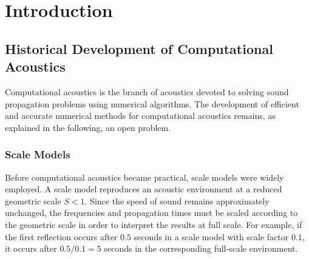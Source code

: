 \documentclass{Configuration_Files/PoliMi3i_thesis}
\begin{document}

\thispagestyle{empty}
\tableofcontents %
\thispagestyle{empty}
\cleardoublepage

%
%
%    
%

\mainmatter %

\chapter{Introduction}
\label{ch:introduction}
\setcounter{secnumdepth}{1}
\section{Historical Development of Computational Acoustics}
Computational acoustics is the branch of acoustics devoted to solving sound propagation problems using numerical algorithms. The development of efficient and accurate numerical methods for computational acoustics remains, as explained in the following, an open problem.

\subsection{Scale Models}
Before computational acoustics became practical, scale models were widely employed. A scale model reproduces an acoustic environment at a reduced geometric scale $S<1$. Since the speed of sound remains approximately unchanged, the frequencies and propagation times must be scaled according to the geometric scale in order to interpret the results at full scale. For example, if the first reflection occurs after $0.5$ seconds in a scale model with scale factor $0.1$, it occurs after $0.5/0.1=5$ seconds in the corresponding full-scale environment.
\end{document}
